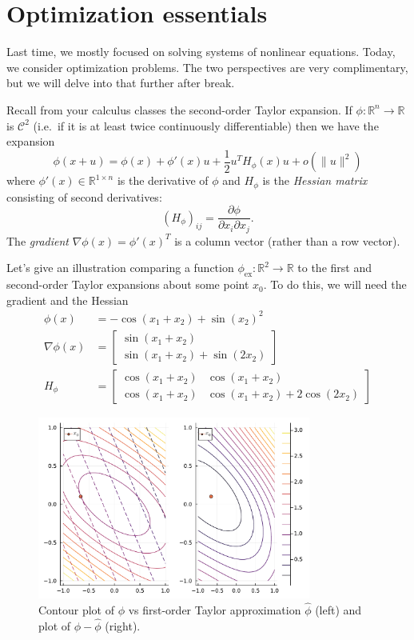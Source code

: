 \documentclass[12pt, leqno]{article} %
\begin{document}

\section{Optimization essentials}

Last time, we mostly focused on solving systems of nonlinear equations.
Today, we consider optimization problems. The two perspectives are very
complimentary, but we will delve into that further after break.

Recall from your calculus classes the second-order Taylor expansion. If
\(\phi : \mathbb{R}^n \rightarrow \mathbb{R}\) is \(\mathcal{C}^2\)
(i.e.~if it is at least twice continuously differentiable) then we have
the expansion
\[\phi(x+u) = \phi(x) + \phi'(x) u + \frac{1}{2} u^T H_{\phi}(x) u + o(\|u\|^2)\]
where \(\phi'(x) \in \mathbb{R}^{1 \times n}\) is the derivative of
\(\phi\) and \(H_{\phi}\) is the \emph{Hessian matrix} consisting of
second derivatives:
\[(H_\phi)_{ij} = \frac{\partial \phi}{\partial x_i \partial x_j}.\] The
\emph{gradient} \(\nabla \phi(x) = \phi'(x)^T\) is a column vector
(rather than a row vector).

Let's give an illustration comparing a function
\(\phi_{\mathrm{ex}} : \mathbb{R}^2 \rightarrow \mathbb{R}\) to the
first and second-order Taylor expansions about some point \(x_0\). To do
this, we will need the gradient and the Hessian \begin{align*}
  \phi(x) &= -\cos(x_1 + x_2) + \sin(x_2)^2\\
  \nabla \phi(x) &=
  \begin{bmatrix} \sin(x_1 + x_2) \\ \sin(x_1+x_2) + \sin(2x_2) \end{bmatrix} \\
  H_{\phi} &=
  \begin{bmatrix}
  \cos(x_1+x_2) & \cos(x_1+x_2) \\
  \cos(x_1+x_2) & \cos(x_1+x_2) + 2 \cos(2x_2)
  \end{bmatrix}
\end{align*}

\begin{figure}
\begin{center}
  \includegraphics[width=0.8\textwidth]{fig/2023-03-31-taylor1.pdf}
\end{center}
\caption{Contour plot of $\phi$ vs first-order Taylor approximation $\hat{\phi}$ (left) and plot of $\phi-\hat{\phi}$ (right).}
\label{fig:taylor1}
\end{figure}
\end{document}
